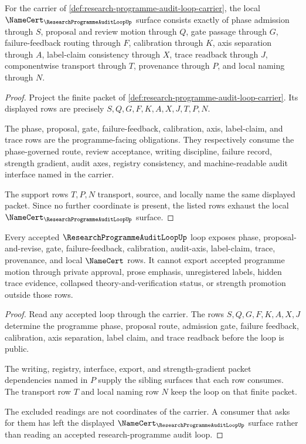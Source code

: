 \begin{theorem}
\label{thm:research-programme-audit-loop-obligation-surface}
For the carrier of \autoref{def:research-programme-audit-loop-carrier}, the local $\NameCert_{\ResearchProgrammeAuditLoopUp}$ surface consists exactly of phase admission through $S$, proposal and review motion through $Q$, gate passage through $G$, failure-feedback routing through $F$, calibration through $K$, axis separation through $A$, label-claim consistency through $X$, trace readback through $J$, componentwise transport through $T$, provenance through $P$, and local naming through $N$.
\end{theorem}
\begin{proof}
Project the finite packet of \autoref{def:research-programme-audit-loop-carrier}. Its displayed rows are precisely $S,Q,G,F,K,A,X,J,T,P,N$.

The phase, proposal, gate, failure-feedback, calibration, axis, label-claim, and trace rows are the programme-facing obligations. They respectively consume the phase-governed route, review acceptance, writing discipline, failure record, strength gradient, audit axes, registry consistency, and machine-readable audit interface named in the carrier.

The support rows $T,P,N$ transport, source, and locally name the same displayed packet. Since no further coordinate is present, the listed rows exhaust the local $\NameCert_{\ResearchProgrammeAuditLoopUp}$ surface.
\end{proof}

\begin{theorem}
\label{thm:research-programme-audit-loop-nonescape}
Every accepted $\ResearchProgrammeAuditLoopUp$ loop exposes phase, proposal-and-revise, gate, failure-feedback, calibration, audit-axis, label-claim, trace, provenance, and local $\NameCert$ rows. It cannot export accepted programme motion through private approval, prose emphasis, unregistered labels, hidden trace evidence, collapsed theory-and-verification status, or strength promotion outside those rows.
\end{theorem}
\begin{proof}
Read any accepted loop through the carrier. The rows $S,Q,G,F,K,A,X,J$ determine the programme phase, proposal route, admission gate, failure feedback, calibration, axis separation, label claim, and trace readback before the loop is public.

The writing, registry, interface, export, and strength-gradient packet dependencies named in $P$ supply the sibling surfaces that each row consumes. The transport row $T$ and local naming row $N$ keep the loop on that finite packet.

The excluded readings are not coordinates of the carrier. A consumer that asks for them has left the displayed $\NameCert_{\ResearchProgrammeAuditLoopUp}$ surface rather than reading an accepted research-programme audit loop.
\end{proof}

